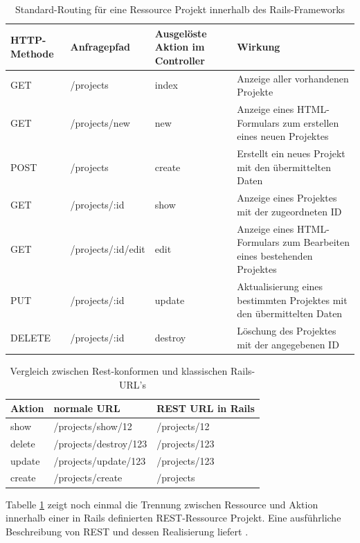 \begin{table}[!h]
\caption{Standard-Routing für eine Ressource Projekt innerhalb des Rails-Frameworks}
\center
\begin{tabular}[!ht]{|p{2cm}|p{3cm}|p{3cm}|p{6cm}|}
\hline
HTTP-Methode & Anfragepfad & Ausgelöste Aktion im Controller & Wirkung\\
\hline
GET	& /projects & index & Anzeige aller vorhandenen Projekte\\
\hline
GET	& /projects/new	& new &	Anzeige eines HTML-Formulars zum erstellen eines neuen Projektes\\
\hline
POST & /projects & create & Erstellt ein neues Projekt mit den übermittelten Daten\\
\hline
GET & /projects/:id &	show &	Anzeige eines Projektes mit der zugeordneten ID\\
\hline
GET	& /projects/:id/edit & edit & Anzeige eines HTML-Formulars zum Bearbeiten eines bestehenden Projektes\\
\hline
PUT	& /projects/:id &	update & Aktualisierung eines bestimmten Projektes mit den übermittelten Daten\\
\hline
DELETE & /projects/:id &	destroy &	Löschung des Projektes mit der angegebenen ID\\
\hline
\end{tabular}
\end{table}

\begin{table}[!ht]
\caption{Vergleich zwischen Rest-konformen und klassischen Rails-URL's}
\label{tab.restnonrest}
\center
\begin{tabular}[!ht]{|l|l|l|}
\hline
Aktion & normale URL & 	REST URL in Rails \\
\hline
show &	/projects/show/12 &	/projects/12 \\
\hline
delete & /projects/destroy/123 & /projects/123 \\
\hline
update & /projects/update/123 &	/projects/123 \\
\hline
create & /projects/create & /projects \\
\hline
\end{tabular}
\end{table}

Tabelle \ref{tab.restnonrest} zeigt noch einmal die Trennung zwischen Ressource und Aktion innerhalb einer in Rails definierten REST-Ressource Projekt. Eine ausführliche Beschreibung von REST und dessen Realisierung liefert \cite{rest}.

\newpage

